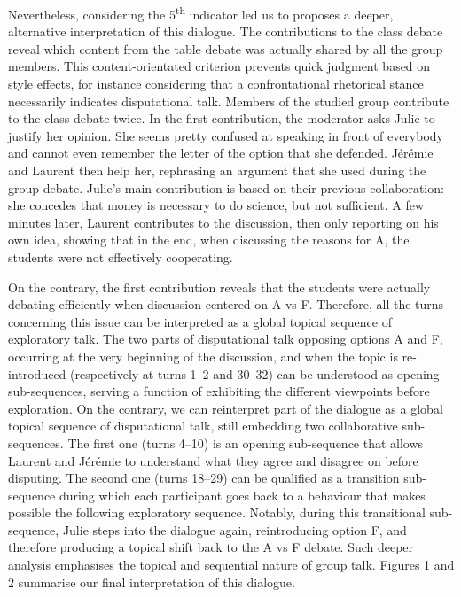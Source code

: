 \documentclass[output=paper]{langscibook}
\begin{document}
Nevertheless, considering the 5\textsuperscript{th} indicator led us to proposes a deeper, alternative interpretation of this dialogue. The contributions to the class debate reveal which content from the table debate was actually shared by all the group members. This content-orientated criterion prevents quick judgment based on style effects, for instance considering that a confrontational rhetorical stance necessarily indicates disputational talk. Members of the studied group contribute to the class-debate twice. In the first contribution, the moderator asks Julie to justify her opinion. She seems pretty confused at speaking in front of everybody and cannot even remember the letter of the option that she defended. Jérémie and Laurent then help her, rephrasing an argument that she used during the group debate. Julie’s main contribution is based on their previous collaboration: she concedes that money is necessary to do science, but not sufficient. A few minutes later, Laurent contributes to the discussion, then only reporting on his own idea, showing that in the end, when discussing the reasons for A, the students were not effectively cooperating.

On the contrary, the first contribution reveals that the students were actually debating efficiently when discussion centered on A vs F. Therefore, all the turns concerning this issue can be interpreted as a global topical sequence of exploratory talk. The two parts of disputational talk opposing options A and F, occurring at the very beginning of the discussion, and when the topic is re-introduced (respectively at turns 1--2 and 30--32) can be understood as opening sub-sequences, serving a function of exhibiting the different viewpoints before exploration. On the contrary, we can reinterpret part of the dialogue as a global topical sequence of disputational talk, still embedding two collaborative sub-sequences. The first one (turns 4--10) is an opening sub-sequence that allows Laurent and Jérémie to understand what they agree and disagree on before disputing. The second one (turns 18--29) can be qualified as a transition sub-sequence during which each participant goes back to a behaviour that makes possible the following exploratory sequence. Notably, during this transitional sub-sequence, Julie steps into the dialogue again, reintroducing option F, and therefore producing a topical shift back to the A vs F debate. Such deeper analysis emphasises the topical and sequential nature of group talk. Figures 1 and 2 summarise our final interpretation of this dialogue.
\end{document}
